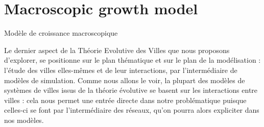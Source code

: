 



\newpage



\section{Macroscopic growth model}{Modèle de croissance macroscopique}


\label{sec:interactiongibrat}




Le dernier aspect de la Théorie Evolutive des Villes que nous proposons d'explorer, se positionne sur le plan thématique et sur le plan de la modélisation : l'étude des villes elles-mêmes et de leur interactions, par l'intermédiaire de modèles de simulation. Comme nous allons le voir, la plupart des modèles de systèmes de villes issus de la théorie évolutive se basent sur les interactions entre villes : cela nous permet une entrée directe dans notre problématique puisque celles-ci se font par l'intermédiaire des réseaux, qu'on pourra alors expliciter dans nos modèles.



